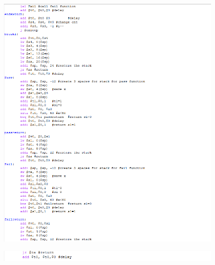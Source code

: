 \documentclass[12pt]{article}
\begin{document}
\begin{figure}[H]
\centering
\includegraphics[scale=0.6]{mips3.png}
\end{figure}
\begin{figure}[H]
\centering
\includegraphics[scale=0.6]{mips4.png}
\end{figure}
\end{document}
